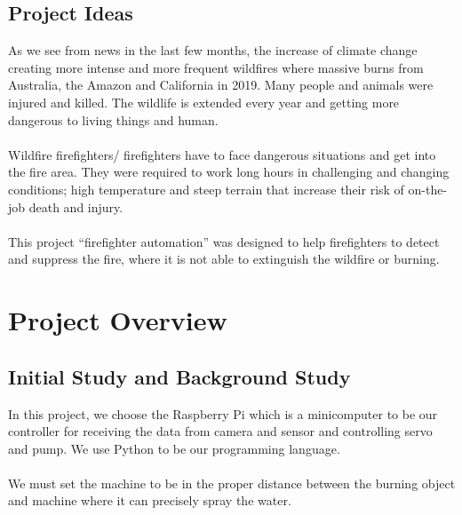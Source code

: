 \documentclass[a4paper,12pt]{article}
\begin{document}
 \subsection{Project Ideas}
As we see from news in the last few months, the increase of climate change creating more intense and more frequent wildfires where massive burns from Australia, the Amazon and California in 2019. Many people and animals were injured and killed. The wildlife is extended every year and getting more dangerous to living things and human.  
\\\\Wildfire firefighters/ firefighters have to face dangerous situations and get into the fire area. They were required to work long hours in challenging and changing conditions; high temperature and steep terrain that increase their risk of on-the-job death and injury.  
 \\\\This project “firefighter automation” was designed to help firefighters to detect and suppress the fire, where it is not able to extinguish the wildfire or burning. 
 \maketitle
 \section{Project Overview }
 \subsection{Initial Study and  Background Study}
In this project, we choose the Raspberry Pi which is a minicomputer to be our controller for receiving the data from camera and sensor and controlling servo and pump. We use Python to be our programming language. 
\\\\We must set the machine to be in the proper distance between the burning object and machine where it can precisely spray the water.

\maketitle
            \newpage
\end{document}
